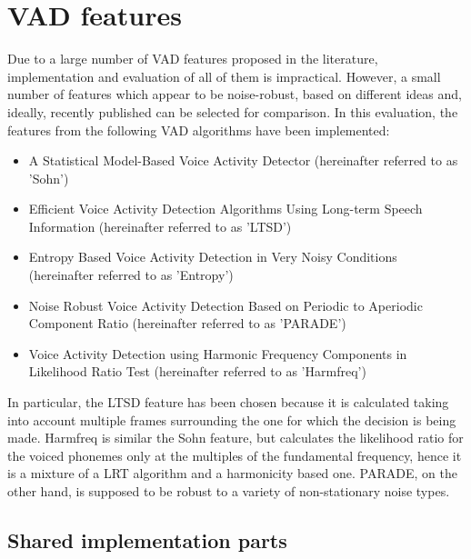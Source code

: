 
\section{VAD features}

Due to a large number of VAD features proposed in the literature, implementation and evaluation of all of them is impractical. However, a small number of features which appear to be noise-robust, based on different ideas and, ideally, recently published can be selected for comparison. In this evaluation, the features from the following VAD algorithms have been implemented:

\begin{itemize}
\item A Statistical Model-Based Voice Activity Detector \cite{Sohn} (hereinafter referred to as 'Sohn')
\item Efficient Voice Activity Detection Algorithms Using Long-term Speech Information \cite{LTSD} (hereinafter referred to as 'LTSD')
\item Entropy Based Voice Activity Detection in Very Noisy Conditions \citep{Renevey} (hereinafter referred to as 'Entropy')
\item Noise Robust Voice Activity Detection Based on Periodic to Aperiodic Component Ratio \cite{PARADE} (hereinafter referred to as 'PARADE')
\item Voice Activity Detection using Harmonic Frequency Components in Likelihood Ratio Test \cite{Tan} (hereinafter referred to as 'Harmfreq')
\end{itemize}

In particular, the LTSD feature has been chosen because it is calculated taking into account multiple frames surrounding the one for which the decision is being made. Harmfreq is similar the Sohn feature, but calculates the likelihood ratio for the voiced phonemes only at the multiples of the fundamental frequency, hence it is a mixture of a LRT algorithm and a harmonicity based one. PARADE, on the other hand, is supposed to be robust to a variety of non-stationary noise types.

\subsection{Shared implementation parts}

